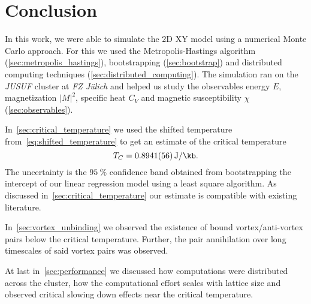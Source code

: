 \section{Conclusion}
In this work, we were able to simulate the $2$D XY model using a numerical Monte Carlo approach. For this we used the Metropolis-Hastings algorithm (\cref{sec:metropolis_hastings}), bootstrapping (\cref{sec:bootstrap}) and distributed computing techniques (\cref{sec:distributed_computing}). The simulation ran on the \emph{JUSUF} cluster at \emph{FZ Jülich} and helped us study the observables energy $E$, magnetization ${\lvert M \rvert}^2$, specific heat $C_V$ and magnetic susceptibility $\chi$ (\cref{sec:observables}).

In~\cref{sec:critical_temperature} we used the shifted temperature  from~\cref{eq:shifted_temperature} to get an estimate of the critical temperature
\begin{equation}
	T_C = \SI{0.8941(56)}{\J\per\kb}.
\end{equation}
The uncertainty is the $\SI{95}{\percent}$ confidence band obtained from bootstrapping the intercept of our linear regression model using a least square algorithm. As discussed in~\cref{sec:critical_temperature} our estimate is compatible with existing literature.

In~\cref{sec:vortex_unbinding} we observed the existence of bound vortex/anti-vortex pairs below the critical temperature. Further, the pair annihilation over long timescales of said vortex pairs was observed.

At last in~\cref{sec:performance} we discussed how computations were distributed across the cluster, how the computational effort scales with lattice size and observed critical slowing down effects near the critical temperature.